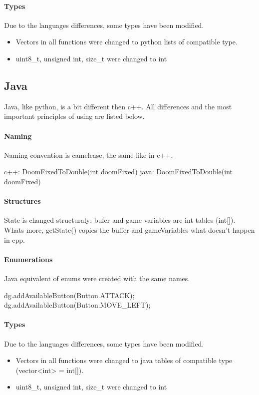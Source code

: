 \paragraph {Types}
Due to the languages differences, some types have been modified.
\begin{itemize} 
\item Vectors in all functions were changed to python lists of compatible type.

\item  uint8\_t, unsigned int, size\_t were changed to int
\end{itemize}



\subsection{Java}
Java, like python, is a bit different then c++. All differences and the most important principles of using are listed below.

\paragraph {Naming}
 Naming convention is camelcase, the same like in c++. 
\begin{cblock}
c++: DoomFixedToDouble(int doomFixed)
java: DoomFixedToDouble(int doomFixed)
\end{cblock}
\paragraph {Structures}
State is changed structuraly: bufer and game variables are int tables (int[]). Whats more, getState() copies the buffer and gameVariables what doesn't happen in cpp. 
\paragraph {Enumerations}
Java equivalent of enums were created with the same names.
\begin{cblock}
dg.addAvailableButton(Button.ATTACK);
dg.addAvailableButton(Button.MOVE_LEFT);
\end{cblock}
\paragraph {Types}
Due to the languages differences, some types have been modified.
\begin{itemize}
\item Vectors in all functions were changed to java tables of compatible type (vector<int> = int[]).
\item uint8\_t, unsigned int, size\_t were changed to int
\end{itemize}
